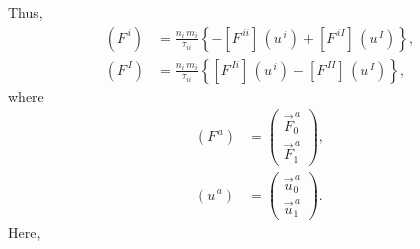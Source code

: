 \documentclass[notitlepage,12pt]{article}
\begin{document}
Thus, 
\begin{align}
(F^{\,i})&= \frac{n_i\,m_i}{\tau_{ii}}\left\{-\left[F^{\,ii}\right]\,(u^{\,i})+\left[F^{\,iI}\right]\,(u^{\,I})\right\},\\[0.5ex]
(F^{\,I})&= \frac{n_i\,m_i}{\tau_{ii}}\left\{\left[F^{\,Ii}\right]\,(u^{\,i})-\left[F^{\,II}\right]\,(u^{\,I})\right\},
\end{align}
where
\begin{align}
(F^{\,a})&= \left(\begin{array}{c}\vec{F}^{\,a}_0\\[0.5ex]\vec{F}^{\,a}_{1}\end{array}\right),\\[0.5ex]
(u^{\,a})&= \left(\begin{array}{c}\vec{u}^{\,a}_0\\[0.5ex]\vec{u}^{\,a}_1\end{array}\right).
\end{align}
Here,
\end{document}
